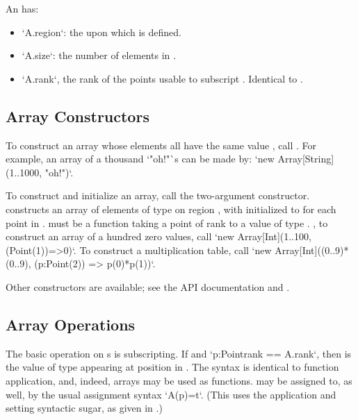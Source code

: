 An   has: 
\begin{itemize}
\item \xcd`A.region`: the  upon which  is defined.
\item \xcd`A.size`: the number of elements in .
\item \xcd`A.rank`, the rank of the points usable to subscript .
      Identical to .
\end{itemize}

\subsection{Array Constructors}

To construct an array whose elements all have the same value , call
. 
For example, an array of a thousand \xcd`"oh!"`s can be made by:
\xcd`new Array[String](1..1000, "oh!")`.


To construct and initialize an array, call the two-argument constructor. 
 constructs an array of elements of type  on
region , with  initialized to  for each point
 in .   must be a function taking a point of rank
 to a value of type .  \Eg, to construct an array of a
hundred zero values, call
\xcd`new Array[Int](1..100, (Point(1))=>0)`. 
To construct a multiplication table, call
\xcd`new Array[Int]((0..9)*(0..9), (p:Point(2)) => p(0)*p(1))`.

Other constructors are available; see the API documentation and
. 

\subsection{Array Operations}

The basic operation on s is subscripting.  If  and 
\xcd`p:Point{rank == A.rank}`, then  is the value of type 
appearing at position  in .    The syntax is identical to
function application, and, indeed, arrays may be used as functions.
 may be assigned to, as well, by the usual assignment syntax
\xcd`A(p)=t`.
(This uses the application and setting syntactic sugar, as given in .)

